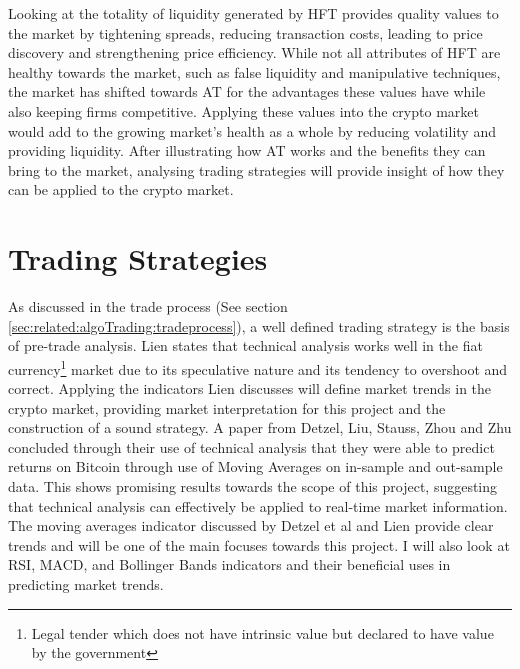 Looking at the totality of liquidity generated by HFT provides quality values to the market by tightening spreads, reducing transaction costs, leading to price discovery and strengthening price efficiency. While not all attributes of HFT are healthy towards the market, such as false liquidity and manipulative techniques, the market has shifted towards AT for the advantages these values have while also keeping firms competitive. Applying these values into the crypto market would add to the growing market's health as a whole by reducing volatility and providing liquidity. After illustrating how AT works and the benefits they can bring to the market, analysing trading strategies will provide insight of how they can be applied to the crypto market.




\section{Trading Strategies}
\label{sec:related:tradingStrategies}
\noindent As discussed in the trade process (See section \ref{sec:related:algoTrading:tradeprocess}), a well defined trading strategy is the basis of pre-trade analysis. Lien \cite{BOOK:Lien:2016} states that technical analysis works well in the fiat currency\footnote{Legal tender which does not have intrinsic value but declared to have value by the government} market due to its speculative nature and its tendency to overshoot and correct. Applying the indicators Lien discusses will define market trends in the crypto market, providing market interpretation for this project and the construction of a sound strategy. A paper from Detzel, Liu, Stauss, Zhou and Zhu \cite{ART:DetzelEtAl:2018} concluded through their use of technical analysis that they were able to predict returns on Bitcoin through use of Moving Averages on in-sample and out-sample data. This shows promising results towards the scope of this project, suggesting that technical analysis can effectively be applied to real-time market information. The moving averages indicator discussed by Detzel et al \cite{ART:DetzelEtAl:2018} and Lien \cite{BOOK:Lien:2016} provide clear trends and will be one of the main focuses towards this project. I will also look at RSI, MACD, and Bollinger Bands indicators and their beneficial uses in predicting market trends.

